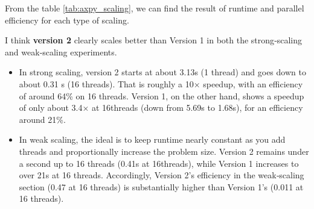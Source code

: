 \documentclass[11pt]{article}
\begin{document}
From the table \ref{tab:axpy_scaling}, we can find the result of runtime and parallel efficiency for each type of scaling. 

I think \textbf{version 2} clearly scales better than Version 1 in both the strong‐scaling and weak‐scaling experiments. 
\begin{itemize}
    \item In strong scaling, version 2 starts at about 3.13s (1 thread) and goes down to about 0.31 s (16 threads). That is roughly a 10× speedup, with an efficiency of around 64\% on 16 threads. Version 1, on the other hand, shows a speedup of only about 3.4× at 16threads (down from 5.69s to 1.68s), for an efficiency around 21\%. 
    \item In weak scaling, the ideal is to keep runtime nearly constant as you add threads and proportionally increase the problem size. Version 2 remains under a second up to 16 threads (0.41s at 16threads), while Version 1 increases to over 21s at 16 threads. Accordingly, Version 2’s efficiency in the weak‐scaling section (0.47 at 16 threads) is substantially higher than Version 1’s (0.011 at 16 threads).
\end{itemize}

\newpage
\end{document}
